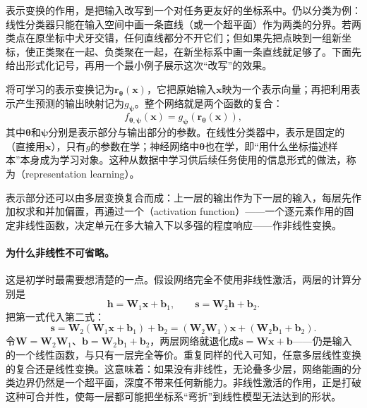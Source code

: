 表示变换的作用，是把输入改写到一个对任务更友好的坐标系中。仍以分类为例：线性分类器只能在输入空间中画一条直线（或一个超平面）作为两类的分界。若两类点在原坐标中犬牙交错，任何直线都分不开它们；但如果先把点映到一组新坐标，使正类聚在一起、负类聚在一起，在新坐标系中画一条直线就足够了。下面先给出形式化记号，再用一个最小例子展示这次“改写”的效果。

将可学习的表示变换记为$\bm{r}_{\bm{\theta}}(\bm{x})$，它把原始输入$\bm{x}$映为一个表示向量；再把利用表示产生预测的输出映射记为$g_{\bm{\psi}}$。整个网络就是两个函数的复合：
\begin{equation}
  f_{\bm{\theta},\bm{\psi}}(\bm{x})
  =g_{\bm{\psi}}\!\left(\bm{r}_{\bm{\theta}}(\bm{x})\right),
  \label{eq:neural-representation-readout}
\end{equation}
其中$\bm{\theta}$和$\bm{\psi}$分别是表示部分与输出部分的参数。在线性分类器中，表示是固定的（直接用$\bm{x}$），只有$g$的参数在学；神经网络中$\bm{\theta}$也在学，即“用什么坐标描述样本”本身成为学习对象。这种从数据中学习供后续任务使用的信息形式的做法，称为（representation learning）。

表示部分还可以由多层变换复合而成：上一层的输出作为下一层的输入，每层先作加权求和并加偏置，再通过一个（activation function）——一个逐元素作用的固定非线性函数，决定单元在多大输入下以多强的程度响应——作非线性变换。

\paragraph{为什么非线性不可省略。}
这是初学时最需要想清楚的一点。假设网络完全不使用非线性激活，两层的计算分别是
\[
  \bm{h}=\bm{W}_1\bm{x}+\bm{b}_1,\qquad
  \bm{s}=\bm{W}_2\bm{h}+\bm{b}_2.
\]
把第一式代入第二式：
\[
  \bm{s}=\bm{W}_2(\bm{W}_1\bm{x}+\bm{b}_1)+\bm{b}_2
       =(\bm{W}_2\bm{W}_1)\bm{x}+(\bm{W}_2\bm{b}_1+\bm{b}_2).
\]
令$\bm{W}=\bm{W}_2\bm{W}_1$、$\bm{b}=\bm{W}_2\bm{b}_1+\bm{b}_2$，两层网络就退化成$\bm{s}=\bm{W}\bm{x}+\bm{b}$——仍是输入的一个线性函数，与只有一层完全等价。重复同样的代入可知，任意多层线性变换的复合还是线性变换。这意味着：如果没有非线性，无论叠多少层，网络能画的分类边界仍然是一个超平面，深度不带来任何新能力。非线性激活的作用，正是打破这种可合并性，使每一层都可能把坐标系“弯折”到线性模型无法达到的形状。

